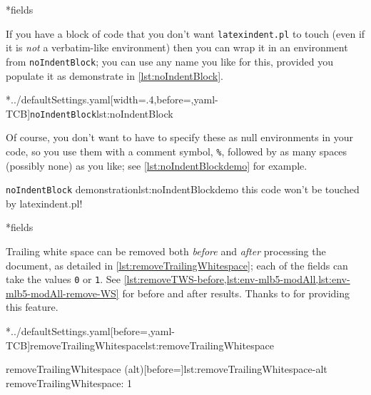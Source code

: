 *{fields}

	If you have a block of code that you don't want \texttt{latexindent.pl} to touch (even if
	it is \emph{not} a verbatim-like environment) then you can wrap it in an
	environment from \texttt{noIndentBlock}; you can use any name you like for this,
	provided you populate it as demonstrate in \cref{lst:noIndentBlock}.

	\cmhlistingsfromfile[style=noIndentBlock]*{../defaultSettings.yaml}[width=.4\linewidth,before=\centering,yaml-TCB]{\texttt{noIndentBlock}}{lst:noIndentBlock}

	Of course, you don't want to have to specify these as null environments in your code, so
	you use them with a comment symbol, \lstinline!%!, followed by as many spaces
	(possibly none) as you like; see \cref{lst:noIndentBlockdemo} for example.

	\begin{cmhlistings}[style=demo,escapeinside={(*@}{@*)}]{\texttt{noIndentBlock} demonstration}{lst:noIndentBlockdemo}
        this code
                won't
     be touched
                    by
             latexindent.pl!
	\end{cmhlistings}

*{fields}\label{yaml:removeTrailingWhitespace}

	Trailing white space can be removed both \emph{before} and
	\emph{after} processing the document, as detailed in \cref{lst:removeTrailingWhitespace};
	each of the fields can take the values \texttt{0} or
	\texttt{1}. See \vref{lst:removeTWS-before,lst:env-mlb5-modAll,lst:env-mlb5-modAll-remove-WS} for before and after results. Thanks
	to \cite{vosskuhle} for providing this feature.

	\begin{minipage}{.4\textwidth}
		\cmhlistingsfromfile[style=removeTrailingWhitespace]*{../defaultSettings.yaml}[before=\centering,yaml-TCB]{removeTrailingWhitespace}{lst:removeTrailingWhitespace}
	\end{minipage}%
	\hfill
	\begin{minipage}{.5\textwidth}
		\begin{yaml}[numbers=none]{removeTrailingWhitespace (alt)}[before=\centering]{lst:removeTrailingWhitespace-alt}
removeTrailingWhitespace: 1
\end{yaml}
	\end{minipage}%

